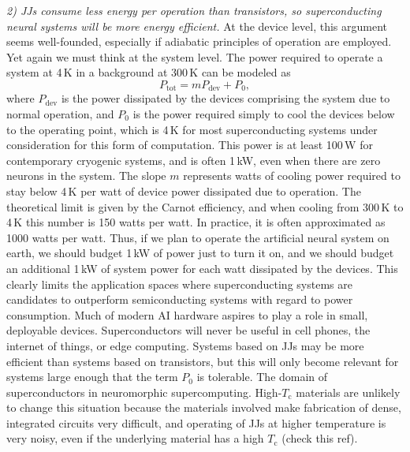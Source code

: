 \documentclass[twocolumn]{article}
\begin{document}
\vspace{1em}
\textit{2) JJs consume less energy per operation than transistors, so superconducting neural systems will be more energy efficient.} \newline At the device level, this argument seems well-founded, especially if adiabatic principles of operation are employed. Yet again we must think at the system level. The power required to operate a system at 4\,K in a background at 300\,K can be modeled as
\begin{equation}
\label{eq:power_to_operate_cryo}
P_{\mathrm{tot}} = m P_{\mathrm{dev}} + P_{\mathrm{0}},
\end{equation}
where $P_{\mathrm{dev}}$ is the power dissipated by the devices comprising the system due to normal operation, and $P_{\mathrm{0}}$ is the power required simply to cool the devices below to the operating point, which is 4\,K for most superconducting systems under consideration for this form of computation. This power is at least 100\,W for contemporary cryogenic systems, and is often 1\,kW, even when there are zero neurons in the system. The slope $m$ represents watts of cooling power required to stay below 4\,K per watt of device power dissipated due to operation. The theoretical limit is given by the Carnot efficiency, and when cooling from 300\,K to 4\,K this number is 150 watts per watt. In practice, it is often approximated as 1000 watts per watt. Thus, if we plan to operate the artificial neural system on earth, we should budget 1\,kW of power just to turn it on, and we should budget an additional 1\,kW of system power for each watt dissipated by the devices. This clearly limits the application spaces where superconducting systems are candidates to outperform semiconducting systems with regard to power consumption. Much of modern AI hardware aspires to play a role in small, deployable devices. Superconductors will never be useful in cell phones, the internet of things, or edge computing. Systems based on JJs may be more efficient than systems based on transistors, but this will only become relevant for systems large enough that the term $P_{\mathrm{0}}$ is tolerable. The domain of superconductors in neuromorphic supercomputing. High-$T_{\mathrm{c}}$ materials are unlikely to change this situation because the materials involved make fabrication of dense, integrated circuits very difficult, and operating of JJs at higher temperature is very noisy, even if the underlying material has a high $T_{\mathrm{c}}$ \cite{lise1991} (check this ref). 
  
\end{document}
